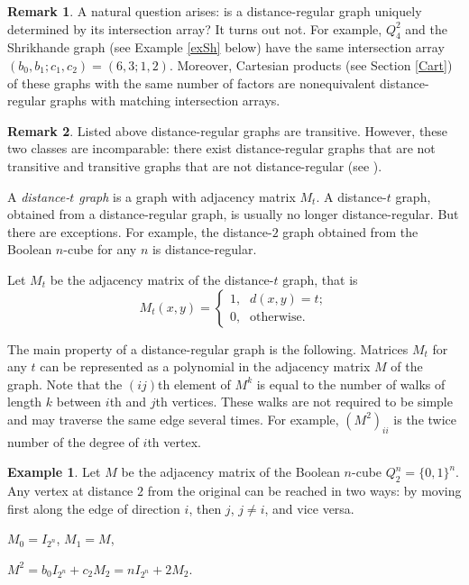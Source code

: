 \documentclass[11pt]{article}
\theoremstyle{definition}
\newtheorem{remark}{Remark}[section]
\newtheorem{example}{Example}[section]
\begin{document}
\begin{remark} A natural question arises: is a distance-regular graph uniquely determined
by its intersection array? It turns out
not. For example, $Q_4^2$ and the Shrikhande graph (see
Example \ref{exSh} below) have the same intersection array
$(b_0,b_{1};c_1,c_2)=(6,3;1,2)$. Moreover, Cartesian products (see Section \ref{Cart})
of these graphs with the same number of factors are nonequivalent distance-regular graphs with matching intersection arrays.
\end{remark}

\begin{remark} 
Listed above distance-regular graphs are transitive.
However, these two classes are incomparable: there exist distance-regular graphs that are not transitive and transitive graphs that are not distance-regular (see \cite{BCN}).
\end{remark}

A  {\sl distance-$t$  graph} is a graph with adjacency matrix $M_t$.
A  {distance-$t$  graph}, obtained from a distance-regular graph, is usually no longer distance-regular. But there are
exceptions. For example, the distance-$2$ graph obtained from  the Boolean $n$-cube for any $n$ is
distance-regular.

Let $M_t$ be the adjacency matrix of the   distance-$t$ graph, that is
\[
M_t(x,y)=\left\{
\begin{array}{ll}
1\mbox{,} & d(x,y)=t;\\
0\mbox{,} & \mbox{otherwise.}
\end{array}
\right.
\]

The main property of a distance-regular graph is the following. Matrices  $M_t$ for any $t$ can be represented as  a polynomial in the adjacency matrix $M$ of the graph.
Note that the $(ij)$th element of $M^k$ is equal to  the number of walks  of length $k$ between
  $i$th and $j$th vertices.  These walks are not required to be simple and may 
traverse the same edge several times.  For example, $(M^2)_{ii}$ is the twice number of the degree of $i$th vertex.

\begin{example}\label{ex:hamm_cube_bool_distmatrix}
Let $M$ be the adjacency matrix of the Boolean $n$-cube $Q^n_2=\{0,1\}^n$.
Any vertex at distance $2$ from the original can be reached
in two ways: by moving
first along the edge of direction $i$, then $j$,  $j\neq i$, and vice versa.

$M_0=I_{2^n}$, $M_1=M$,

$M^2 = b_0I_{2^n}+c_2M_2= n I_{2^n} +2M_2$. \end{example}
\end{document}
